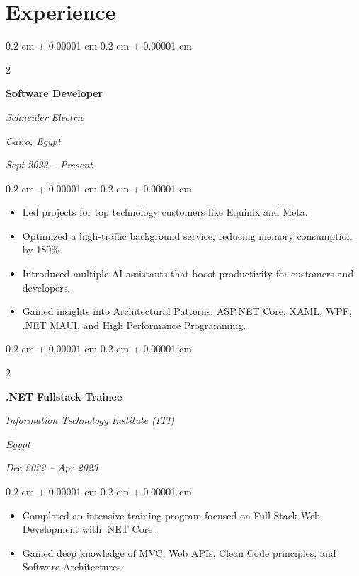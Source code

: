 \documentclass[10pt, letterpaper]{article}
\newenvironment{highlights}{ 
\begin{itemize}[ 
 topsep=0.10 cm, 
 parsep=0.10 cm, 
 partopsep=0pt, 
 itemsep=0pt, 
 leftmargin=0.4 cm + 10pt 
] 
 }{ 
\end{itemize} 
 } %
\newenvironment{onecolentry}{ 
\begin{adjustwidth}{ 
 0.2 cm + 0.00001 cm 
}{ 
 0.2 cm + 0.00001 cm 
} 
 }{ 
\end{adjustwidth} 
 } %
\newenvironment{twocolentry}[2][]{ 
\onecolentry 
\def\secondColumn{#2} 
\setcolumnwidth{\fill, 4.5 cm} 
\begin{paracol}{2} 
 }{ 
\switchcolumn \raggedleft \secondColumn 
\end{paracol} 
\endonecolentry 
 } %
\begin{document}
\section{Experience} 

 \begin{twocolentry}{ 
 \textit{Cairo, Egypt}
 
 \textit{Sept 2023 – Present}} 
\textbf{Software Developer} 
 
\textit{Schneider Electric} 
 \end{twocolentry} 

 \vspace{0.10 cm} 
 \begin{onecolentry} 
\begin{highlights} 
 \item Led projects for top technology customers like Equinix and Meta. 
 \item Optimized a high-traffic background service, reducing memory consumption by 180\%. 
 \item Introduced multiple AI assistants that boost productivity for customers and developers. 
 \item Gained insights into Architectural Patterns, ASP.NET Core, XAML, WPF, .NET MAUI, and High Performance Programming. 
\end{highlights} 
 \end{onecolentry} 


 \vspace{0.2 cm} 

 \begin{twocolentry}{ 
 \textit{Egypt}
 
 \textit{Dec 2022 – Apr 2023}} 
\textbf{.NET Fullstack Trainee} 
 
\textit{Information Technology Institute (ITI)} 
 \end{twocolentry} 

 \vspace{0.10 cm} 
 \begin{onecolentry} 
\begin{highlights} 
 \item Completed an intensive training program focused on Full-Stack Web Development with .NET Core. 
 \item Gained deep knowledge of MVC, Web APIs, Clean Code principles, and Software Architectures. 
\end{highlights} 
 \end{onecolentry} 

 \vspace{0.2 cm} 
\end{document}
